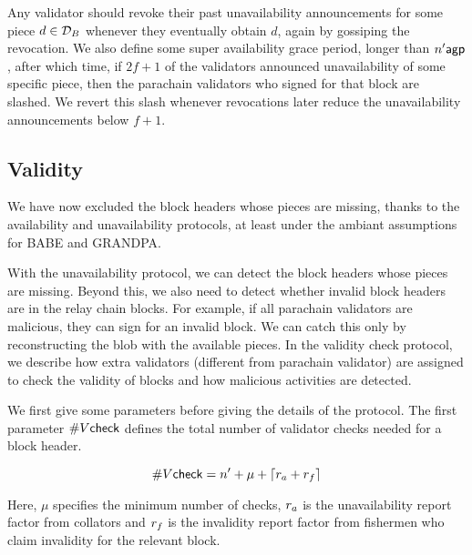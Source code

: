 Any validator should revoke their past unavailability announcements for some piece $d \in \mathcal{D}_B$ whenever they eventually obtain $d$, again by gossiping the revocation.  We also define some super availability grace period, longer than $n' \mathsf{agp}$, after which time, if $2 f + 1$ of the validators announced unavailability of some specific piece, then the parachain validators who signed for that block are slashed.
We revert this slash whenever revocations later reduce the unavailability announcements below $f+1$.










\subsection{Validity}
\label{sec:validity}

We have now excluded the block headers whose pieces are missing, thanks to the availability and unavailability protocols, at least under the ambiant assumptions for BABE and GRANDPA.



With the unavailability protocol, we can detect the block headers whose pieces are missing. Beyond this, we also need to detect whether invalid block headers are in the relay chain blocks. For example, if all parachain validators are malicious, they can sign for an invalid block. We can catch this only by reconstructing the blob with the available pieces. In the validity check protocol, we describe how extra validators (different from parachain validator) are assigned to check the validity of blocks and how malicious activities are detected.


We first give some parameters before giving the details of the protocol.
The first parameter $\#V\mathsf{check}$ defines the total number of validator checks needed for a block header.

$$\#V\mathsf{check} = n' + \mu +\lceil r_{a} + r_{f} \rceil$$

Here, $\mu$ specifies the minimum number of checks, $r_{a}$ is the unavailability report factor from collators and $r_{f}$ is the invalidity report factor from fishermen who claim invalidity for the relevant block. 






